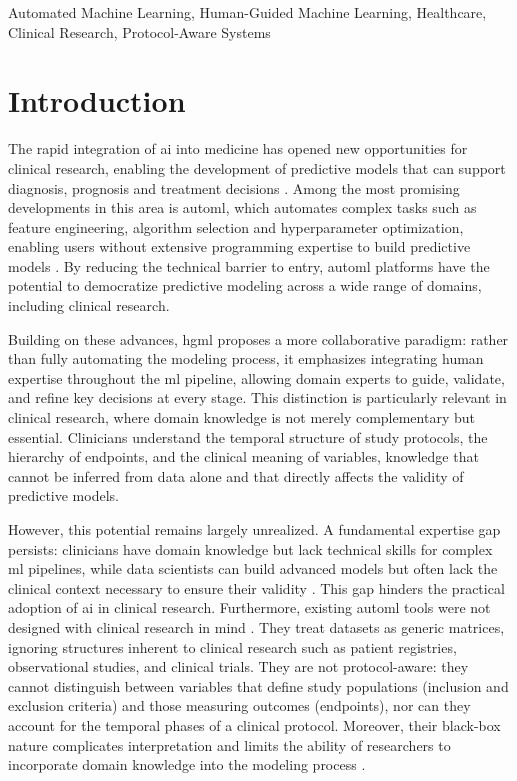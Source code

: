 \documentclass[conference,onecolumn]{IEEEtran}
\begin{document}
\begin{IEEEkeywords}
Automated Machine Learning, Human-Guided Machine Learning, Healthcare, Clinical Research, Protocol-Aware Systems
\end{IEEEkeywords}

\section{Introduction}
\label{sec:introduction}

The rapid integration of \gls{ai} into medicine has opened new opportunities for 
clinical research, enabling the development of predictive models that can support 
diagnosis, prognosis and treatment decisions \cite{sirocchi2024medical}. Among the 
most promising developments in this area is \gls{automl}, which automates complex 
tasks such as feature engineering, algorithm selection and hyperparameter optimization, enabling users without extensive programming expertise to build predictive models \cite{karmaker2021automl}. By reducing the technical barrier to entry, \gls{automl} platforms have the potential to democratize predictive modeling across a wide range of domains, including clinical research.

Building on these advances, \gls{hgml} \cite{gil2019towards} proposes a more 
collaborative paradigm: rather than fully automating the modeling process, it emphasizes integrating human expertise throughout the \gls{ml} pipeline, allowing domain experts to guide, validate, and refine key decisions at every stage. This distinction is particularly relevant in clinical research, where domain knowledge is not merely complementary but essential. Clinicians understand the temporal structure of study protocols, the hierarchy of endpoints, and the clinical meaning of variables, knowledge that cannot be inferred from data alone and that directly affects the validity of predictive models.

However, this potential remains largely unrealized. A fundamental expertise gap persists: clinicians have domain knowledge but lack technical skills for complex \gls{ml} pipelines, while data scientists can build advanced models but often lack the clinical context necessary to ensure their validity \cite{gisselbaek2025bridging}. This gap hinders the practical adoption of \gls{ai} in clinical research. Furthermore, existing \gls{automl} tools were not designed with clinical research in mind \cite{waring2020automated}. They treat datasets as generic matrices, ignoring structures inherent to clinical research such as patient registries, observational studies, and clinical trials. They are not protocol-aware: they cannot distinguish between variables that define study populations (inclusion and exclusion criteria) and those measuring outcomes (endpoints), nor can they account for the temporal phases of a clinical protocol. Moreover, their black-box nature complicates interpretation and limits the ability of researchers to incorporate domain knowledge into the modeling process \cite{sirocchi2024medical}.
\end{document}

